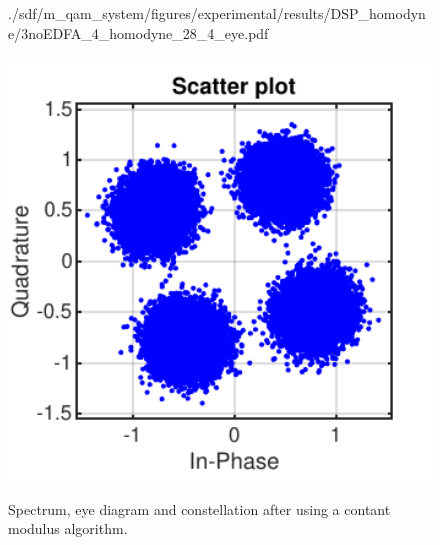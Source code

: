 \begin{figure}[H]
\begin{minipage}{0.30\textwidth}
			{./sdf/m_qam_system/figures/experimental/results/DSP_homodyne/3noEDFA_4_homodyne_28_4_eye.pdf}
			\label{fig:16GBdSpecMF}
		\end{minipage}
		\begin{minipage}{0.30\textwidth}
			\centering
			\includegraphics[width=1\textwidth]
			{./sdf/m_qam_system/figures/experimental/results/DSP_homodyne/3noEDFA_4_homodyne_28_4_const.pdf}\\
			\label{fig:16GBdSpecBefFec}
		\end{minipage}
		\caption{Spectrum, eye diagram and constellation after using a contant modulus
		algorithm.}
		\label{fig:16GBMFHm}
	\end{figure}


